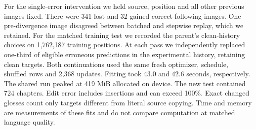 For the single-error intervention we held source, position and all other previous images fixed. There were 341 lost and 32 gained correct following images. One pre-divergence image disagreed between batched and stepwise replay, which we retained. For the matched training test we recorded the parent's clean-history choices on 1,762,187 training positions. At each pass we independently replaced one-third of eligible erroneous predictions in the experimental history, retaining clean targets. Both continuations used the same fresh optimizer, schedule, shuffled rows and 2,368 updates. Fitting took 43.0 and 42.6 seconds, respectively. The shared run peaked at 419 MiB allocated on device. The new test contained 724 chapters. Edit error includes insertions and can exceed 100\%. Exact changed glosses count only targets different from literal source copying. Time and memory are measurements of these fits and do not compare computation at matched language quality.
